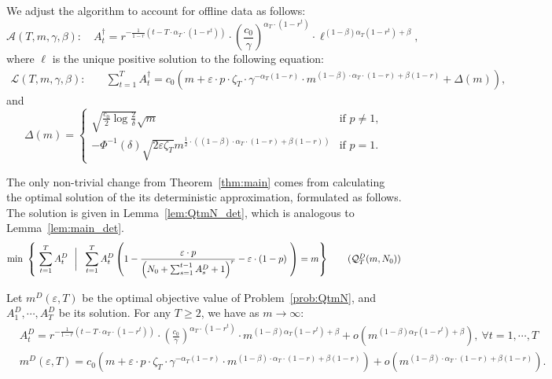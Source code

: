\documentclass[nonblindrev]{informs3noheader}
\def\calA{\mathcal{A}}
\def\calL{\mathcal{L}}
\def\calQ{\mathcal{Q}}
\begin{document}
We adjust the algorithm to account for offline data as follows:
\begin{equation}\label{eq:allocation_QtmN}
    \calA(T,m,\gamma,\beta):\quad A^\dagger_t=r^{-\frac{1}{1-r}\left(t-T\cdot\alpha_T\cdot(1-r^t)\right)}\cdot \left(\frac{c_0}{\gamma}\right)^{\alpha_T\cdot(1-r^t)}\cdot \ell^{(1-\beta)\alpha_T\left(1-r^t\right) + \beta},
\end{equation}
where $\ell$ is the unique positive solution to the following equation:
\begin{align*}
    \calL(T,m,\gamma,\beta):\quad&\sum_{t=1}^T A^\dagger_t=  c_0 \left(m + \varepsilon\cdot p\cdot\zeta_T\cdot \gamma^{-\alpha_T(1-r)}\cdot m^{(1-\beta)\cdot\alpha_T\cdot(1-r)+\beta(1-r)}+ \Delta(m)\right),
\end{align*}
and
$$\Delta(m) = \begin{cases}
    \sqrt{\frac{c_0}{2}\log \frac{2}{\delta}}\sqrt{m} & \text{if }p \neq 1,\\
    -\Phi^{-1}(\delta) \sqrt{2\varepsilon \zeta_T} m^{\frac{1}{2}\cdot \left((1-\beta)\cdot\alpha_T\cdot(1-r)+\beta(1-r)\right)}& \text{if }p = 1.\end{cases}$$

The only non-trivial change from Theorem~\ref{thm:main} comes from calculating the optimal solution of the its deterministic approximation, formulated as follows. The solution is given in Lemma~\ref{lem:QtmN_det}, which is analogous to Lemma~\ref{lem:main_det}.
\begin{align}
    \min\ \left\{\ \sum_{t=1}^T A^{D}_t \ \ \bigg|\ \ \sum_{t=1}^TA^{D}_t \left(1 - \frac{\varepsilon\cdot p}{\left(N_0+ \sum_{s=1}^{t-1} A^{D}_s +1\right)^r} - \varepsilon\cdot(1-p)\ \right)=m\right\} \label{prob:QtmN_det} \tag{$\calQ^D_T(m,N_0)$}
\end{align}

\begin{lemma}\label{lem:QtmN_det}
Let $m^D(\varepsilon, T)$ be the optimal objective value of Problem~\eqref{prob:QtmN}, and $A^{D}_1,\cdots, A^{D}_T$ be its solution. For any $T\geq 2$, we have as $m \to \infty$: 
\begin{align*}
       & A^{D}_t = r^{-\frac{1}{1-r}\left(t-T\cdot\alpha_T\cdot(1-r^t)\right)}\cdot \left(\frac{c_0}{\gamma}\right)^{\alpha_T\cdot(1-r^t)}\cdot m^{(1-\beta)\alpha_T\left(1-r^t\right) + \beta}+o\left(m^{(1-\beta)\alpha_T\left(1-r^t\right) + \beta}\right),\ \forall t=1,\cdots,T\\
       &m^D(\varepsilon, T) = c_0 \left(m + \varepsilon\cdot p\cdot\zeta_T\cdot \gamma^{-\alpha_T(1-r)}\cdot m^{(1-\beta)\cdot\alpha_T\cdot(1-r)+\beta(1-r)}\right)+o\left(m^{(1-\beta)\cdot\alpha_T\cdot(1-r)+\beta(1-r)}\right).
\end{align*}
\end{lemma}
\end{document}
